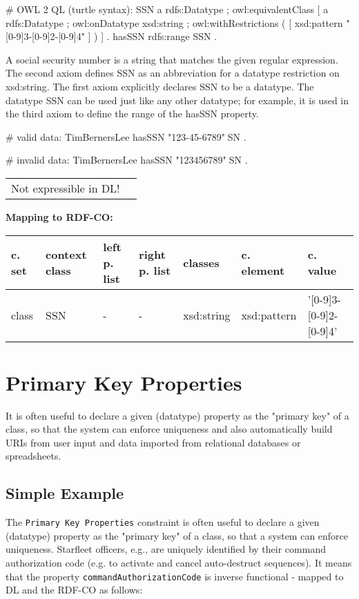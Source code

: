 \documentclass{llncs}
\newcommand{\ms}[1]{\texttt{#1}}
\newenvironment{gcotable}{
  \scriptsize
  \sffamily
  \vspace{0cm}
	\begin{center}
	\textbf{\vspace{0.4cm}Mapping to RDF-CO:} \\
  \begin{tabular}{l|l|l|l|l|l|l}
	\hline
  \textbf{c. set} & \textbf{context class} & \textbf{left p. list} & \textbf{right p. list} & \textbf{classes} & \textbf{c. element} & \textbf{c. value} \\
  \hline

}{
  \hline
  \end{tabular}
	\end{center}
}
\newenvironment{DL}{
\vspace{0cm}
	\begin{center}
  \begin{tabular}{r l}

}{
  \end{tabular}
	\end{center}
}
\begin{document}
\begin{ex}
# OWL 2 QL (turtle syntax):
SSN 
    a rdfs:Datatype ;
    owl:equivalentClass [
        a rdfs:Datatype ;
        owl:onDatatype xsd:string ;
        owl:withRestrictions ( 
            [ xsd:pattern "[0-9]{3}-[0-9]{2}-[0-9]{4}" ] ) ] .
hasSSN rdfs:range SSN .
\end{ex}

A social security number is a string that matches the given regular expression. 
The second axiom defines SSN as an abbreviation for a datatype restriction on xsd:string. 
The first axiom explicitly declares SSN to be a datatype. 
The datatype SSN can be used just like any other datatype; 
for example, it is used in the third axiom to define the range of the hasSSN property. 

\begin{ex}
# valid data:
TimBernersLee
    hasSSN "123-45-6789"^^SSN .
\end{ex}

\begin{ex}
# invalid data:
TimBernersLee
    hasSSN "123456789"^^SSN .
\end{ex}

\begin{DL}
Not expressible in DL!
\end{DL}

\begin{gcotable}
class & SSN & - & - & xsd:string & xsd:pattern & '[0-9]{3}-[0-9]{2}-[0-9]{4}' \\
\end{gcotable}

\section{Primary Key Properties}

It is often useful to declare a given (datatype) property as the "primary key" of a class, so that the system can enforce uniqueness and also automatically build URIs from user input and data imported from relational databases or spreadsheets. 




\subsection{Simple Example}

The \ms{Primary Key Properties} constraint is often useful to declare a given (datatype) property as the "primary key" of a class, so that a system can enforce uniqueness. 
Starfleet officers, e.g., are uniquely identified by their command authorization code (e.g. to activate and cancel auto-destruct sequences).
It means that the property \ms{commandAuthorizationCode} is inverse functional - mapped to DL and the RDF-CO as follows:
\end{document}
